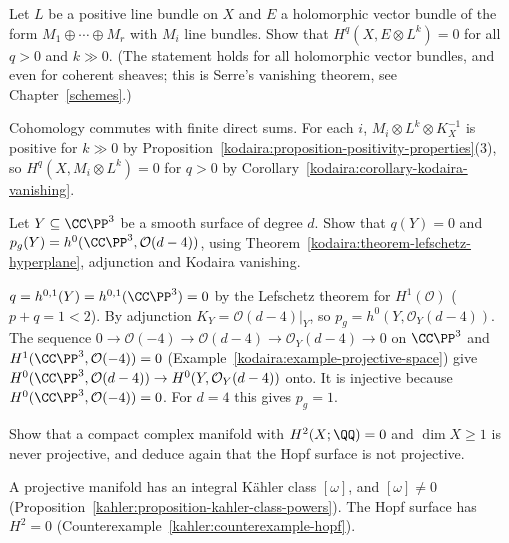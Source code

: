 \begin{exercise}\label{kodaira:exercise-serre-vanishing}
Let $L$ be a positive line bundle on $X$ and $E$ a holomorphic vector bundle of the form $M_1 \oplus \cdots \oplus M_r$ with $M_i$ line bundles. Show
that $H^q(X, E \otimes L^k) = 0$ for all $q > 0$ and $k \gg 0$. (The statement holds for all holomorphic vector bundles, and even for coherent
sheaves; this is Serre's vanishing theorem, see Chapter~\ref{schemes}.)
\end{exercise}

\begin{solution}
Cohomology commutes with finite direct sums. For each $i$, $M_i \otimes L^k \otimes K_X^{-1}$ is positive for $k \gg 0$ by
Proposition~\ref{kodaira:proposition-positivity-properties}(3), so $H^q(X, M_i \otimes L^k) = 0$ for $q > 0$ by
Corollary~\ref{kodaira:corollary-kodaira-vanishing}.
\end{solution}

\begin{exercise}\label{kodaira:exercise-hypersurface-hodge}
Let $Y \subseteq \CC\PP^3$ be a smooth surface of degree $d$. Show that $q(Y) = 0$ and $p_g(Y) = h^0(\CC\PP^3, \mathcal{O}(d - 4))$, using
Theorem~\ref{kodaira:theorem-lefschetz-hyperplane}, adjunction and Kodaira vanishing.
\end{exercise}

\begin{solution}
$q = h^{0,1}(Y) = h^{0,1}(\CC\PP^3) = 0$ by the Lefschetz theorem for $H^1(\mathcal{O})$ ($p + q = 1 < 2$). By adjunction
$K_Y = \mathcal{O}(d - 4)|_Y$, so $p_g = h^0(Y, \mathcal{O}_Y(d - 4))$. The sequence $0 \to \mathcal{O}(-4) \to \mathcal{O}(d - 4) \to \mathcal{O}_Y(d - 4) \to 0$ on
$\CC\PP^3$ and $H^1(\CC\PP^3, \mathcal{O}(-4)) = 0$ (Example~\ref{kodaira:example-projective-space}) give $H^0(\CC\PP^3, \mathcal{O}(d-4)) \to H^0(Y, \mathcal{O}_Y(d-4))$
onto. It is injective because $H^0(\CC\PP^3, \mathcal{O}(-4)) = 0$. For $d = 4$ this gives $p_g = 1$.
\end{solution}

\begin{exercise}\label{kodaira:exercise-not-hodge}
Show that a compact complex manifold with $H^2(X; \QQ) = 0$ and $\dim X \geq 1$ is never projective, and deduce again that the Hopf surface is not
projective.
\end{exercise}

\begin{solution}
A projective manifold has an integral K\"ahler class $[\omega]$, and $[\omega] \neq 0$ (Proposition~\ref{kahler:proposition-kahler-class-powers}). The Hopf
surface has $H^2 = 0$ (Counterexample~\ref{kahler:counterexample-hopf}).
\end{solution}

